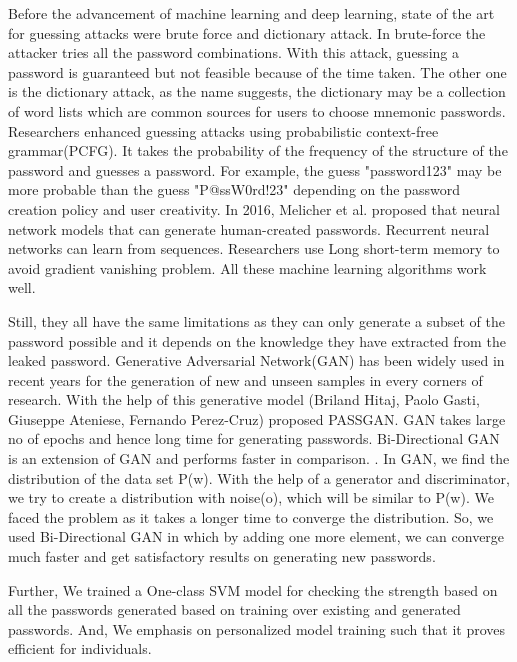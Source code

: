 \documentclass[runningheads]{llncs}
\begin{document}
Before the advancement of machine learning and deep learning, state of the art for guessing attacks were brute force and dictionary attack. In brute-force \cite{8400211} the attacker tries all the password combinations. With this attack, guessing a password is guaranteed but not feasible because of the time taken. The other one is the dictionary attack, as the name suggests, the dictionary may be a collection of word lists which are common sources for users to choose mnemonic passwords.\cite{8400211} Researchers enhanced guessing attacks using probabilistic context-free grammar(PCFG).\cite{5207658} It takes the probability of the frequency of the structure of the password and guesses a password. For example, the guess "password123" may be more probable than the guess "P@ssW0rd!23" depending on the password creation policy and user creativity. In 2016, Melicher et al. proposed that neural network models that can generate human-created passwords.\cite{197243} Recurrent neural networks can learn from sequences. Researchers use Long short-term memory to avoid gradient vanishing problem. \cite{DBLP:journals/corr/Lipton15} All these machine learning algorithms work well. 

Still, they all have the same limitations as they can only generate a subset of the password possible and it depends on the knowledge they have extracted from the leaked password. Generative Adversarial Network(GAN) has been widely used in recent years for the generation of new and unseen samples in every corners of research. \cite{goodfellow2014generative} With the help of this generative model (Briland Hitaj, Paolo Gasti, Giuseppe Ateniese, Fernando Perez-Cruz) proposed PASSGAN.\cite{DBLP:journals/corr/abs-1709-00440} GAN takes large no of epochs and hence long time for generating passwords. Bi-Directional GAN is an extension of GAN and performs faster in comparison. \cite{DBLP:journals/corr/DonahueKD16}. In GAN, we find the distribution of the data set P(w). With the help of a generator and discriminator, we try to create a distribution with noise(o), which will be similar to P(w). We faced the problem as it takes a longer time to converge the distribution. So, we used Bi-Directional GAN in which by adding one more element, we can converge much faster and get satisfactory results on generating new passwords. 

Further, We trained a One-class SVM model for checking the strength based on all the passwords generated based on training over existing and generated passwords. And, We emphasis on personalized model training such that it proves efficient for individuals. 
\end{document}
